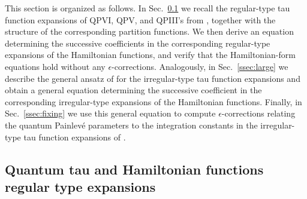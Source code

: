 \documentclass[12pt,a4paper]{article}
\numberwithin{equation}{section}
\begin{document}
This section is organized as follows. In Sec.~\ref{ssec:small} we recall the regular-type tau function expansions of QPVI, QPV, and QPIII's from \cite{BST25}, together with the structure of the corresponding partition functions. We then derive an equation determining the successive coefficients in the corresponding regular-type expansions of the Hamiltonian functions, and verify that the Hamiltonian-form equations hold without any $\epsilon$-corrections. Analogously, in Sec.~\ref{ssec:large} we describe the general ansatz of \cite{BST25} for the irregular-type tau function expansions and obtain a general equation determining the successive coefficient in the corresponding irregular-type expansions of the Hamiltonian functions. Finally, in Sec.~\ref{ssec:fixing} we use this general equation to compute $\epsilon$-corrections relating the quantum Painlev\'e parameters to the integration constants in the irregular-type tau function expansions of \cite{BST25}.

\subsection{Quantum tau and Hamiltonian functions regular type expansions}
\label{ssec:small}
\end{document}
